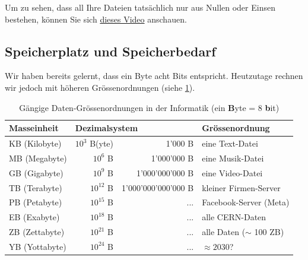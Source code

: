 \begin{myexercise}
	Um zu sehen, dass all Ihre Dateien tatsächlich nur aus Nullen oder Einsen bestehen, können Sie sich \href{https://moodle.ksimlee.ch/pluginfile.php/56580/mod_lesson/page_contents/2836/VideoXxdDemo.mov}{dieses Video} anschauen.
\end{myexercise}


\subsection{Speicherplatz und Speicherbedarf}
Wir haben bereits gelernt, dass ein Byte acht Bits entspricht. Heutzutage rechnen wir jedoch mit höheren Grössenordnungen (siehe \cref{table:daten-groessenordnungen}).

\begin{table}[H]
	\centering
	\begin{tabular}{@{}l|rr|l@{}}
		\toprule
		\textbf{Masseinheit} & \multicolumn{2}{l|}{\textbf{Dezimalsystem}} & Grössenordnung                                   \\ \midrule
		KB (Kilobyte)        & $10^3$ B(yte)                               & 1’000 B             & eine Text-Datei            \\
		MB (Megabyte)        & $10^6$ B                                    & 1’000’000 B         & eine Musik-Datei           \\
		GB (Gigabyte)        & $10^9$ B                                    & 1'000'000'000 B     & eine Video-Datei           \\
		TB (Terabyte)        & $10^{12}$ B                                 & 1'000'000'000'000 B & kleiner Firmen-Server      \\
		PB (Petabyte)        & $10^{15}$ B                                 & ...                 & Facebook-Server (Meta)     \\
		EB (Exabyte)         & $10^{18}$ B                                 & ...                 & alle CERN-Daten            \\
		ZB (Zettabyte)       & $10^{21}$ B                                 & ...                 & alle Daten ($\sim$ 100 ZB) \\
		YB (Yottabyte)       & $10^{24}$ B                                 & ...                 & $\approx 2030$?            \\ \bottomrule
	\end{tabular}
	\caption{Gängige Daten-Grössenordnungen in der Informatik (ein \textbf{B}yte = 8 \textbf{b}it)}
	\label{table:daten-groessenordnungen}
\end{table}

